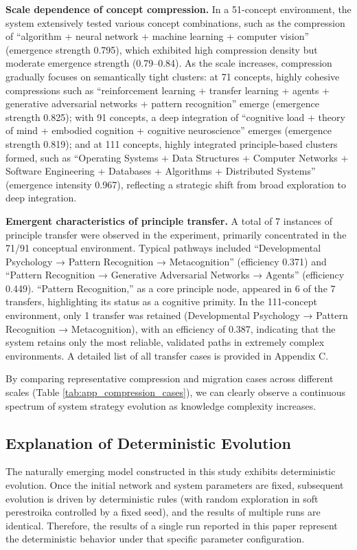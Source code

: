 \documentclass[10pt,onecolumn]{article}
\begin{document}
\textbf{Scale dependence of concept compression.} In a 51-concept environment, the system extensively tested various concept combinations, such as the compression of “algorithm + neural network + machine learning + computer vision” (emergence strength 0.795), which exhibited high compression density but moderate emergence strength (0.79–0.84). As the scale increases, compression gradually focuses on semantically tight clusters: at 71 concepts, highly cohesive compressions such as “reinforcement learning + transfer learning + agents + generative adversarial networks + pattern recognition” emerge (emergence strength 0.825); with 91 concepts, a deep integration of “cognitive load + theory of mind + embodied cognition + cognitive neuroscience” emerges (emergence strength 0.819); and at 111 concepts, highly integrated principle-based clusters formed, such as “Operating Systems + Data Structures + Computer Networks + Software Engineering + Databases + Algorithms + Distributed Systems” (emergence intensity 0.967), reflecting a strategic shift from broad exploration to deep integration.

\textbf{Emergent characteristics of principle transfer.} A total of 7 instances of principle transfer were observed in the experiment, primarily concentrated in the 71/91 conceptual environment. Typical pathways included “Developmental Psychology → Pattern Recognition → Metacognition” (efficiency 0.371) and “Pattern Recognition → Generative Adversarial Networks → Agents” (efficiency 0.449). “Pattern Recognition,” as a core principle node, appeared in 6 of the 7 transfers, highlighting its status as a cognitive primity. In the 111-concept environment, only 1 transfer was retained (Developmental Psychology → Pattern Recognition → Metacognition), with an efficiency of 0.387, indicating that the system retains only the most reliable, validated paths in extremely complex environments. A detailed list of all transfer cases is provided in Appendix C.

By comparing representative compression and migration cases across different scales (Table \ref{tab:app_compression_cases}), we can clearly observe a continuous spectrum of system strategy evolution as knowledge complexity increases.

\subsection{Explanation of Deterministic Evolution}

The naturally emerging model constructed in this study exhibits deterministic evolution. Once the initial network and system parameters are fixed, subsequent evolution is driven by deterministic rules (with random exploration in soft perestroika controlled by a fixed seed), and the results of multiple runs are identical. Therefore, the results of a single run reported in this paper represent the deterministic behavior under that specific parameter configuration.
\end{document}
